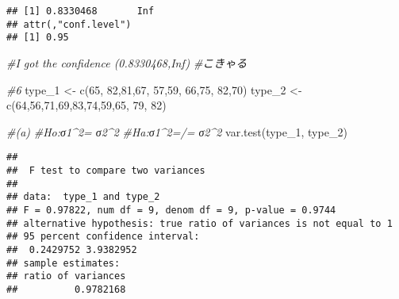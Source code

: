 \documentclass[
]{article}
\newenvironment{Shaded}{\begin{snugshade}}{\end{snugshade}}
\newcommand{\CommentTok}[1]{\textcolor[rgb]{0.56,0.35,0.01}{\textit{#1}}}
\newcommand{\DecValTok}[1]{\textcolor[rgb]{0.00,0.00,0.81}{#1}}
\newcommand{\FunctionTok}[1]{\textcolor[rgb]{0.00,0.00,0.00}{#1}}
\newcommand{\NormalTok}[1]{#1}
\newcommand{\OtherTok}[1]{\textcolor[rgb]{0.56,0.35,0.01}{#1}}
\newcommand{\SpecialCharTok}[1]{\textcolor[rgb]{0.00,0.00,0.00}{#1}}
\begin{document}
\begin{Shaded}
\end{Shaded}

\begin{verbatim}
## [1] 0.8330468       Inf
## attr(,"conf.level")
## [1] 0.95
\end{verbatim}

\begin{Shaded}
\begin{Highlighting}[]
\CommentTok{\#I got the confidence (0.8330468,Inf)}
\CommentTok{\#こきゃる}
\end{Highlighting}
\end{Shaded}

\begin{Shaded}
\begin{Highlighting}[]
\CommentTok{\#6}
\NormalTok{type\_1 }\OtherTok{\textless{}{-}} \FunctionTok{c}\NormalTok{(}\DecValTok{65}\NormalTok{, }\DecValTok{82}\NormalTok{,}\DecValTok{81}\NormalTok{,}\DecValTok{67}\NormalTok{, }\DecValTok{57}\NormalTok{,}\DecValTok{59}\NormalTok{, }\DecValTok{66}\NormalTok{,}\DecValTok{75}\NormalTok{, }\DecValTok{82}\NormalTok{,}\DecValTok{70}\NormalTok{)}
\NormalTok{type\_2 }\OtherTok{\textless{}{-}} \FunctionTok{c}\NormalTok{(}\DecValTok{64}\NormalTok{,}\DecValTok{56}\NormalTok{,}\DecValTok{71}\NormalTok{,}\DecValTok{69}\NormalTok{,}\DecValTok{83}\NormalTok{,}\DecValTok{74}\NormalTok{,}\DecValTok{59}\NormalTok{,}\DecValTok{65}\NormalTok{, }\DecValTok{79}\NormalTok{, }\DecValTok{82}\NormalTok{)}

\CommentTok{\#(a)}
\CommentTok{\#Ho:σ1\^{}2= σ2\^{}2}
\CommentTok{\#Ha:σ1\^{}2=/= σ2\^{}2}
\FunctionTok{var.test}\NormalTok{(type\_1, type\_2)}
\end{Highlighting}
\end{Shaded}

\begin{verbatim}
## 
##  F test to compare two variances
## 
## data:  type_1 and type_2
## F = 0.97822, num df = 9, denom df = 9, p-value = 0.9744
## alternative hypothesis: true ratio of variances is not equal to 1
## 95 percent confidence interval:
##  0.2429752 3.9382952
## sample estimates:
## ratio of variances 
##          0.9782168
\end{verbatim}
\end{document}
